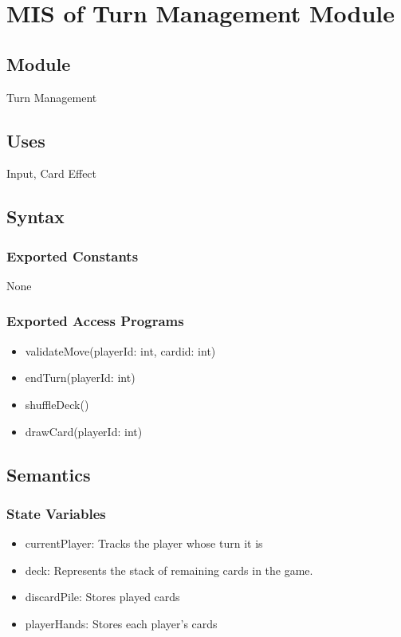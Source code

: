 \documentclass[12pt, titlepage]{article}
\begin{document}
\section{MIS of Turn Management Module} 
\label{TMM}

\subsection{Module}
\hspace{1.5em}Turn Management

\subsection{Uses}
\hspace{1.5em}Input, Card Effect

\subsection{Syntax}

\subsubsection{Exported Constants}
\hspace{1.5em}None

\subsubsection{Exported Access Programs}

\begin{itemize}
\item validateMove(playerId: int, cardid: int)
\item endTurn(playerId: int)
\item shuffleDeck()
\item drawCard(playerId: int)
\end{itemize}

\subsection{Semantics}

\subsubsection{State Variables}
\begin{itemize}
\item currentPlayer: Tracks the player whose turn it is
\item deck: Represents the stack of remaining cards in the game.
\item discardPile: Stores played cards
\item playerHands: Stores each player's cards
\end{itemize}
\end{document}
